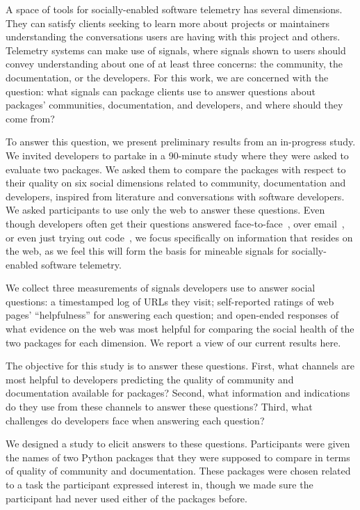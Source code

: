 A space of tools for socially-enabled software telemetry has several dimensions.
They can satisfy clients seeking to learn more about projects or maintainers understanding the conversations users are having with this project and others.
Telemetry systems can make use of signals, where signals shown to users should convey understanding about one of at least three concerns:
the community, the documentation, or the developers.
For this work, we are concerned with the question:
what signals can package clients use to answer questions about packages' communities, documentation, and developers, and where should they come from?

To answer this question, we present preliminary results from an in-progress study.
We invited developers to partake in a 90-minute study where they were asked to evaluate two packages.
We asked them to compare the packages with respect to their quality on six social dimensions related to community, documentation and developers, inspired from literature and conversations with software developers.
We asked participants to use only the web to answer these questions.
Even though developers often get their questions answered face-to-face~\cite{latoza_maintaining_2006,storey_revolution_2014}, over email~\cite{latoza_maintaining_2006,ko_information_2007}, or even just trying out code~\cite{brandt_two_2009}, we focus specifically on information that resides on the web, as we feel this will form the basis for mineable signals for socially-enabled software telemetry.

We collect three measurements of signals developers use to answer social questions:
a timestamped log of URLs they visit;
self-reported ratings of web pages' ``helpfulness'' for answering each question;
and open-ended responses of what evidence on the web was most helpful for comparing the social health of the two packages for each dimension.
We report a view of our current results here.


The objective for this study is to answer these questions.
First, what channels are most helpful to developers predicting the quality of community and documentation available for packages?
Second, what information and indications do they use from these channels to answer these questions?
Third, what challenges do developers face when answering each question?

We designed a study to elicit answers to these questions.
Participants were given the names of two Python packages that they were supposed to compare in terms of quality of community and documentation.
These packages were chosen related to a task the participant expressed interest in, though we made sure the participant had never used either of the packages before.

